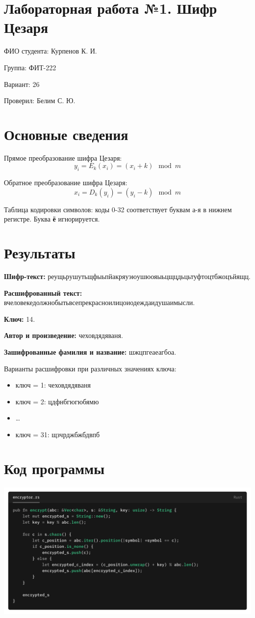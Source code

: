 \documentclass[a4paper]{report}
\begin{document}
\section*{Лабораторная работа №1. Шифр Цезаря}

ФИО студента: Курпенов К. И.

Группа: ФИТ-222

Вариант: 26

Проверил: Белим С. Ю.

\section*{Основные сведения}

Прямое преобразование шифра Цезаря: $$y_i = E_k(x_i) = (x_i + k)\mod{m}$$

Обратное преобразование шифра Цезаря: $$x_i = D_k(y_i) = (y_i - k)\mod{m}$$

Таблица кодировки символов: коды 0-32 соответствует буквам а-я в нижнем регистре.
Буква \textbf{ё} игнорируется.

\section*{Результаты}

\textbf{Шифр-текст:}
реущьрушутьщфыьпйакряуэюушюояыьцщцдьцьтуфтоцтбжоцъйящц.

\textbf{Расшифрованный текст:}
вчеловекедолжнобытьвсепрекрасноилицоиодеждаидушаимысли.

\textbf{Ключ:} 14.

\textbf{Автор и произведение:} чеховдядяваня.

\textbf{Зашифрованные фамилия и название:} шжцпгеаеагбоа.

Варианты расшифровки при различных значениях ключа:
\begin{itemize}
  \item ключ = 1: чеховдядяваня
  \item ключ = 2: цдфнбгюгюбямю
  \item \ldots
  \item ключ = 31: щзчрджбжбдвпб
\end{itemize}

\section*{Код программы}

\includegraphics[width=1\textwidth]{images/caesar_cipher_encryptor.png}
\end{document}

